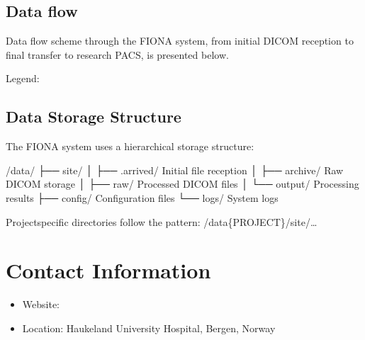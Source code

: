 \documentclass[letterpaper,10pt,english]{sphinxmanual}
\begin{document}
\sphinxAtStartPar
{}


\section{Data flow}
\label{\detokenize{Architecture/index:data-flow}}
\sphinxAtStartPar
Data flow scheme through the FIONA system, from initial DICOM reception to final transfer to research PACS, is presented below.


\sphinxAtStartPar
Legend:




\section{Data Storage Structure}
\label{\detokenize{Architecture/index:data-storage-structure}}
\sphinxAtStartPar
The FIONA system uses a hierarchical storage structure:

\begin{sphinxVerbatim}[commandchars=\\\{\}]
/data/
├── site/
│   ├── .arrived/         \PYGZsh{} Initial file reception
│   ├── archive/          \PYGZsh{} Raw DICOM storage
│   ├── raw/              \PYGZsh{} Processed DICOM files
│   └── output/           \PYGZsh{} Processing results
├── config/               \PYGZsh{} Configuration files
└── logs/                 \PYGZsh{} System logs
\end{sphinxVerbatim}

\sphinxAtStartPar
Project\sphinxhyphen{}specific directories follow the pattern:
/data\{PROJECT\}/site/…


\chapter{Contact Information}
\label{\detokenize{index:contact-information}}\begin{itemize}
\item {} 
\sphinxAtStartPar
Website: 

\item {} 
\sphinxAtStartPar
Location: Haukeland University Hospital, Bergen, Norway

\end{itemize}
\end{document}
